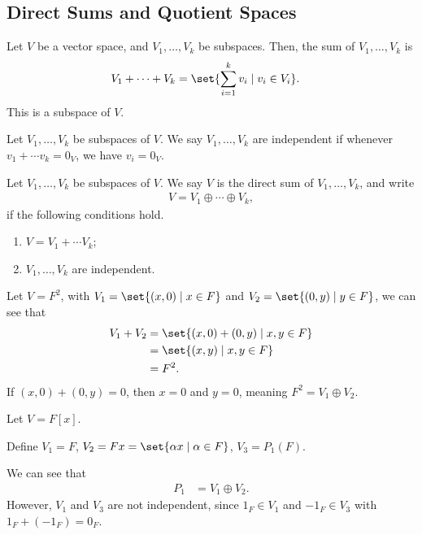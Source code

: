 \documentclass[10pt]{mypackage}
\begin{document}
\subsection{Direct Sums and Quotient Spaces}%
\begin{definition}
  Let $V$ be a vector space, and $V_1,\dots,V_k$ be subspaces. Then, the sum of $V_1,\dots,V_k$ is
  \begin{align*}
    V_1 + \cdots + V_k &= \set{\sum_{i=1}^{k}v_i\mid v_i\in V_i}.
  \end{align*}
  This is a subspace of $V$.
\end{definition}
\begin{definition}
  Let $V_1,\dots,V_k$ be subspaces of $V$. We say $V_1,\dots,V_k$ are independent if whenever $v_1 + \cdots v_k = 0_V$, we have $v_i = 0_V$.
\end{definition}
\begin{definition}
  Let $V_1,\dots,V_k$ be subspaces of $V$. We say $V$ is the direct sum of $V_1,\dots,V_k$, and write
  \begin{align*}
    V = V_1 \oplus \cdots \oplus V_k,
  \end{align*}
  if the following conditions hold.
  \begin{enumerate}[(1)]
    \item $V = V_1 + \cdots V_k$;
    \item $V_1,\dots,V_k$ are independent.
  \end{enumerate}
\end{definition}
\begin{example}
  Let $V = F^2$, with $V_1 = \set{\left(x,0\right)\mid x\in F}$ and $V_2 = \set{\left(0,y\right)\mid y\in F}$, we can see that
  \begin{align*}
    V_1 + V_2 &= \set{\left(x,0\right) + \left(0,y\right)\mid x,y\in F}\\
              &= \set{\left(x,y\right)\mid x,y\in F}\\
              &= F^2.
  \end{align*}
  If $\left(x,0\right) + \left(0,y\right) = 0$, then $x = 0$ and $y = 0$, meaning $F^2 = V_1\oplus V_2$.
\end{example}
\begin{example}
  Let $V = F[x]$.\newline

  Define $V_1 = F$, $V_2 = F x = \set{\alpha x\mid \alpha \in F}$, $V_3 = P_1\left(F\right)$.\newline

  We can see that
  \begin{align*}
    P_1 &= V_1\oplus V_2.
  \end{align*}
  However, $V_1$ and $V_3$ are not independent, since $1_{F}\in V_1$ and $-1_{F}\in V_3$ with $1_{F} + \left(-1_{F}\right) = 0_F$.
\end{example}
\end{document}
